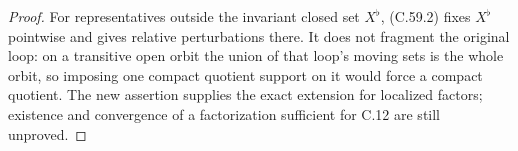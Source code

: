 \begin{proof}
For representatives outside the invariant closed set
$X^\flat$, (C.59.2) fixes $X^\flat$ pointwise and gives
relative perturbations there. It does not fragment
the original loop: on a transitive open orbit the
union of that loop's moving sets is the whole orbit,
so imposing one compact quotient support on it would
force a compact quotient. The new assertion supplies
the exact extension for localized factors; existence
and convergence of a factorization sufficient for
C.12 are still unproved.
\end{proof}
